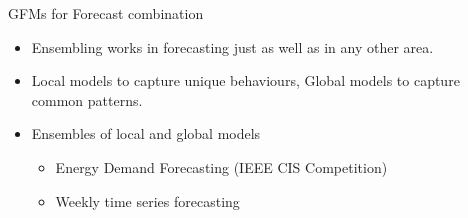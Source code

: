 \documentclass{beamer}
\begin{document}
 \begin{frame}{GFMs for Forecast combination}
   	\begin{itemize}
    			\item  Ensembling works in forecasting just as well as in any other area.
    			  \vspace{2.0mm}
    			\item  Local models to capture unique behaviours, Global models to capture common patterns.
    			  \vspace{2.0mm}
   		 	\item  Ensembles of local and global models
   		 		\begin{itemize}\color{blue}
						\item Energy Demand Forecasting (IEEE CIS Competition)
						\item Weekly time series forecasting~\cite{Godahewa2020-wg}
				\end{itemize}
 	\end{itemize}
\end{frame} 


%

    
%
%    
%    
\end{document}
